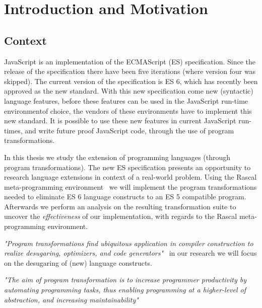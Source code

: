 
\chapter{Introduction and Motivation}

\label{Chapter1}


\section{Context}
JavaScript is an implementation of the ECMAScript (ES) specification. Since the release of the  specification there have been five iterations (where version four was skipped). The current version of the specification is ES 6, which has recently been approved as the new standard. With this new specification come new (syntactic) language features, before these features can be used in the JavaScript run-time environment\footnotemark of choice, the vendors of these environments have to implement this new standard. It is possible to use these new features in current JavaScript run-times, and write future proof JavaScript code, through the use of program transformations.

In this thesis we study the extension of programming languages (through program transformations). The new ES specification presents an opportunity to research language extensions in context of a real-world problem. Using the Rascal meta-programming environment~\cite{Klinta} we will implement the program transformations needed to eliminate ES 6 language constructs to an ES 5 compatible program. Afterwards we perform an analysis on the resulting transformation suite to uncover the \emph{effectiveness} of our implementation, with regards to the Rascal meta-programming environment.

\textit{"Program transformations find ubiquitous application in compiler construction to realize desugaring, optimizers, and code generators"}~\cite{Erdweg2014}
in our research we will focus on the desugaring of (new) language constructs.

\textit{"The aim of program transformation is to increase programmer productivity by automating programming tasks, thus enabling programming at a higher-level of abstraction, and increasing maintainability"}~\cite{Visser2001}

